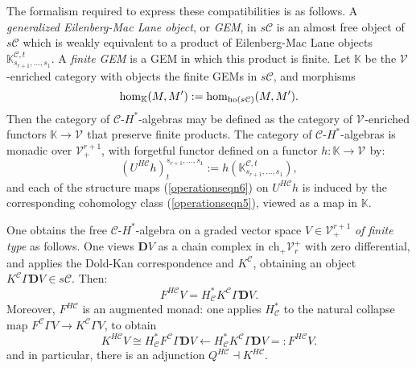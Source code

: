 \documentclass[11pt]{amsart} \renewcommand{\baselinestretch}{1.2}
\theoremstyle{plain}
\numberwithin{equation}{section} %
\theoremstyle{plain}
\numberwithin{equation}{chapter} %
\renewcommand{\to}{\longrightarrow}
\newcommand{\from}{\longleftarrow}
\newcommand{\calV}{\mathcal{V}}
\newcommand{\calc}{\mathcal{C}}
\newcommand{\vect}[2]{\calV^{#1}_{#2}}
\newcommand{\HA}[1]{H#1}
\newcommand{\complexes}{\mathrm{ch}_+}
\newcommand{\dual}{\mathbf{D}}
\begin{document}
\begin{Pi-algebras and cohomology algebras}
The formalism required to express these compatibilities is as follows. A \emph{generalized Eilenberg-Mac Lane object}, or \emph{GEM}, in $s\calc$ is an almost free object of $s\calc$ which is weakly equivalent to a product of Eilenberg-Mac Lane objects  $\mathbb{K}_{s_{r+1},\ldots,s_{1}}^{\calc,t}$. A \emph{finite GEM} is a GEM in which this product is finite. Let $\mathbb{K}$  be the $\vect{}{}$-enriched category with objects the finite GEMs in $s\calc$, and morphisms
\[\hom_{\mathbb{K}}(M,M'):=\hom_{\textup{ho}(s\calc)}(M,M').\]
Then the category of $\calc$-$H^*$-algebras  may be defined as the category of $\vect{}{}$-enriched functors $\mathbb{K}\to \vect{}{}$ that preserve finite products. The category of $\calc$-$H^*$-algebras is monadic over $\vect{r+1}{+}$, with forgetful functor defined  on a functor $h:\mathbb{K}\to \vect{}{}$  by:%
\[(U^{\HA{\calc}}h)_t^{s_{r+1},\ldots,s_1}:=h(\mathbb{K}_{s_{r+1},\ldots,s_{1}}^{\calc,t}),\]
and each of the structure maps (\ref{operationseqn6}) on $U^{\HA{\calc}}h$ is induced by the corresponding cohomology class (\ref{operationseqn5}), viewed as a map in $\mathbb{K}$. %


One obtains the free $\calc$-$H^*$-algebra on a graded vector space $V\in \vect{r+1}{+}$ \emph{of finite type} as follows. One views $\dual V$ as a chain complex in $\complexes\vect{+}{r}$ with zero differential, and applies the Dold-Kan correspondence and $K^\calc$, obtaining an object $K^\calc\Gamma \dual V\in s\calc$. Then:
\[F^{\HA{\calc}}V=H^*_{\calc}K^\calc\Gamma\dual V.\]
Moreover, $F^{\HA{\calc}}$ is an augmented monad: one applies $H^*_{\calc}$ to the natural collapse map $F^{\calc}\Gamma V\to K^{\calc}\Gamma V$, to obtain
\[K^{\HA{\calc}}V\cong H^*_{\calc} F^{\calc}\Gamma \dual V\from H^*_{\calc} K^{\calc}\Gamma \dual V=:F^{\HA{\calc}}V.\]
and in particular, there is an adjunction $Q^{\HA{\calc}}\dashv K^{\HA{\calc}}$.


\end{Pi-algebras and cohomology algebras}
\end{document}
